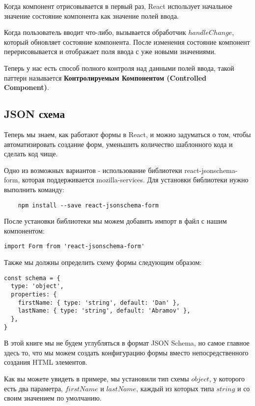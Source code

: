 Когда компонент отрисовывается в первый раз, React использует начальное значение состояние компонента как значение полей ввода. 

Когда пользователь вводит что-либо, вызывается обработчик $handleChange$, который обновляет состояние компонента. После изменения состояние компонент перерисовывается и отображает поля ввода с уже новыми значениями.

Теперь у нас есть способ полного контроля над данными полей ввода, такой паттерн называется \textbf{Контролируемым Компонентом (Controlled Component)}.

\subsection{JSON схема}

Теперь мы знаем, как работают формы в React, и можно задуматься о том, чтобы автоматизировать создание форм, уменьшить количество шаблонного кода и сделать код чище.

Одно из возможных вариантов - использование библиотеки react-jsonschema-form, которая поддерживается mozilla-services. Для установки библиотеки нужно выполнить команду:

\begin{lstlisting}
	npm install --save react-jsonschema-form
\end{lstlisting}

После установки библиотеки мы можем добавить импорт в файл с нашим компонентом:

\begin{lstlisting}
import Form from 'react-jsonschema-form'
\end{lstlisting}

Также мы должны определить схему формы следующим образом:

\begin{lstlisting}
const schema = {
  type: 'object',
  properties: {
    firstName: { type: 'string', default: 'Dan' },
    lastName: { type: 'string', default: 'Abramov' },
  },
}
\end{lstlisting}

В этой книге мы не будем углубляться в формат JSON Schema, но самое главное здесь то, что мы можем создать конфигурацию формы вместо непосредственного создания HTML элементов.

Как вы можете увидеть в примере, мы установили тип схемы $object$, у которого есть два параметра, $firstName$ и $lastName$, каждый из которых типа $string$ и со своим значением по умолчанию.


